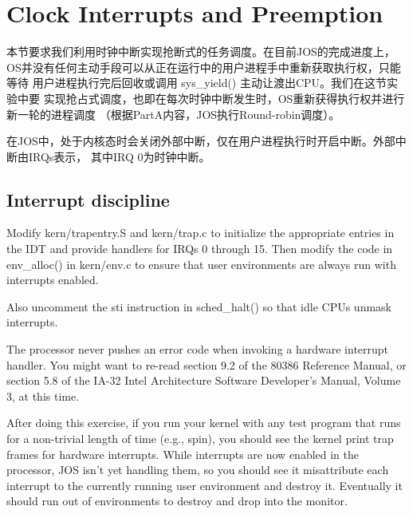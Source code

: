 \documentclass[12pt, letterpaper]{report}
\begin{document}
\section[\large Clock Interrupts and Preemption]{Clock Interrupts and Preemption}
本节要求我们利用时钟中断实现抢断式的任务调度。在目前JOS的完成进度上，
OS并没有任何主动手段可以从正在运行中的用户进程手中重新获取执行权，只能等待
用户进程执行完后回收或调用 sys\_yield() 主动让渡出CPU。我们在这节实验中要
实现抢占式调度，也即在每次时钟中断发生时，OS重新获得执行权并进行新一轮的进程调度
（根据PartA内容，JOS执行Round-robin调度）。\par 
在JOS中，处于内核态时会关闭外部中断，仅在用户进程执行时开启中断。外部中断由IRQs表示，
其中IRQ 0为时钟中断。\par 

\subsection{Interrupt discipline}

{
    \par
    {
        Modify kern/trapentry.S and kern/trap.c to initialize 
        the appropriate entries in the IDT and 
        provide handlers for IRQs 0 through 15. 
        Then modify the code in env\_alloc() in kern/env.c 
        to ensure that user environments are always run 
        with interrupts enabled.
    }
    \par
    {
        Also uncomment the sti instruction in sched\_halt() so that idle CPUs unmask interrupts.
    }
    \par
    
    {
        The processor never pushes an error code when invoking 
        a hardware interrupt handler. 
        You might want to re-read section 9.2 of the 80386 
        Reference Manual, 
        or section 5.8 of the IA-32 Intel Architecture Software 
        Developer's Manual, Volume 3, at this time.
    }
    \par 
    {
        After doing this exercise, 
        if you run your kernel with any test program that runs 
        for a non-trivial length of time (e.g., spin), 
        you should see the kernel print trap frames for 
        hardware interrupts. 
        While interrupts are now enabled in the processor, 
        JOS isn't yet handling them, 
        so you should see it misattribute each interrupt 
        to the currently running user environment and destroy it. 
        Eventually it should run out of environments to destroy 
        and drop into the monitor.
    }
    \par 
}
\end{document}
